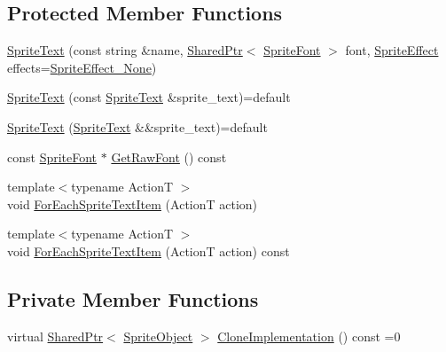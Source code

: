 \subsection*{Protected Member Functions}
\begin{DoxyCompactItemize}
\item 
\hyperlink{classmage_1_1_sprite_text_a929b24bba456bfd37a9ebf04db88d4c5}{Sprite\+Text} (const string \&name, \hyperlink{namespacemage_a1e01ae66713838a7a67d30e44c67703e}{Shared\+Ptr}$<$ \hyperlink{classmage_1_1_sprite_font}{Sprite\+Font} $>$ font, \hyperlink{namespacemage_a9cfe18123066ba4236f548f9de75d881}{Sprite\+Effect} effects=\hyperlink{namespacemage_a9cfe18123066ba4236f548f9de75d881af3c275fbfacfe174da928b2f24dfa515}{Sprite\+Effect\+\_\+\+None})
\item 
\hyperlink{classmage_1_1_sprite_text_a76ee01b719ee90418740a2c10392acae}{Sprite\+Text} (const \hyperlink{classmage_1_1_sprite_text}{Sprite\+Text} \&sprite\+\_\+text)=default
\item 
\hyperlink{classmage_1_1_sprite_text_ab569dfa4ff5a30f0a23005c43635aad7}{Sprite\+Text} (\hyperlink{classmage_1_1_sprite_text}{Sprite\+Text} \&\&sprite\+\_\+text)=default
\item 
const \hyperlink{classmage_1_1_sprite_font}{Sprite\+Font} $\ast$ \hyperlink{classmage_1_1_sprite_text_ab67ba17af1b19766343d04f10853c8d6}{Get\+Raw\+Font} () const
\item 
{\footnotesize template$<$typename ActionT $>$ }\\void \hyperlink{classmage_1_1_sprite_text_af1236ba7c80c61be058a21ef1d4c483d}{For\+Each\+Sprite\+Text\+Item} (ActionT action)
\item 
{\footnotesize template$<$typename ActionT $>$ }\\void \hyperlink{classmage_1_1_sprite_text_ab8576580e5b3c0bb568c1256a0b989bc}{For\+Each\+Sprite\+Text\+Item} (ActionT action) const
\end{DoxyCompactItemize}
\subsection*{Private Member Functions}
\begin{DoxyCompactItemize}
\item 
virtual \hyperlink{namespacemage_a1e01ae66713838a7a67d30e44c67703e}{Shared\+Ptr}$<$ \hyperlink{classmage_1_1_sprite_object}{Sprite\+Object} $>$ \hyperlink{classmage_1_1_sprite_text_acf74e687f38c6253bf5851bc4548352e}{Clone\+Implementation} () const =0
\end{DoxyCompactItemize}
